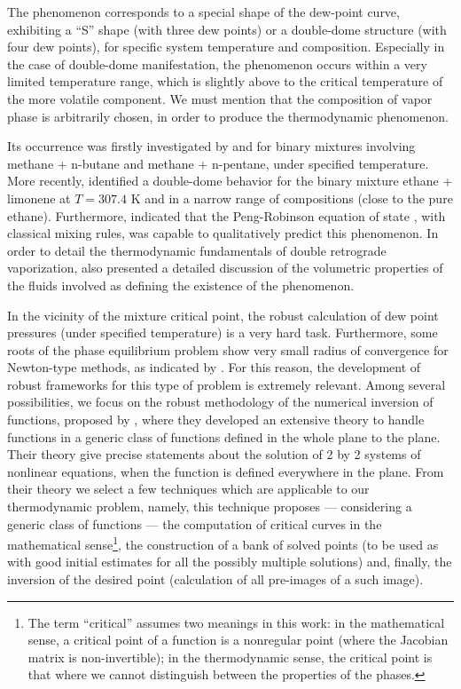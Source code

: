 \documentclass[journal=iecred,manuscript=article]{achemso}
\theoremstyle{definition}
\theoremstyle{remark}
\begin{document}
The phenomenon corresponds to a special shape of the dew-point curve, exhibiting a \enquote{S} shape (with three dew points) or a double-dome structure (with four dew points), for specific system temperature and composition. Especially in the case of double-dome manifestation, the phenomenon occurs within a very limited temperature range, which is slightly above to the critical temperature of the more volatile component. We must mention that the composition of vapor phase is arbitrarily chosen, in order to produce the thermodynamic phenomenon.

Its occurrence was firstly investigated by \citet{chen_1} and \citet{chen_2} for binary mixtures involving methane + n-butane and methane + n-pentane, under specified temperature. More recently, \citet{raeissi_1} identified a double-dome behavior for the binary mixture ethane + limonene at $T = 307.4$ K and in a narrow range of compositions (close to the pure ethane). Furthermore, \citet{raeissi_2} indicated that the Peng-Robinson equation of state \citep{peng_robinson}, with classical mixing rules, was capable to qualitatively predict this phenomenon. In order to detail the thermodynamic fundamentals of double retrograde vaporization, \citet{raeissi2004thermodynamic} also presented a detailed discussion of the volumetric properties of the fluids involved as defining the existence of the phenomenon.

In the vicinity of the mixture critical point, the robust calculation of dew point pressures (under specified temperature) is a very hard task. Furthermore, some roots of the phase equilibrium problem show very small radius of convergence for Newton-type methods, as indicated by \citet{jnsa}. For this reason, the development of robust frameworks for this type of problem is extremely relevant. Among several possibilities, we focus on the robust methodology of the numerical inversion of functions, proposed by \citet{malta}, 
where they developed an extensive theory to handle functions
in a generic class of functions
defined in the whole plane to the plane. 
Their theory give precise statements about the 
solution of 2 by 2 systems of nonlinear equations, when 
the function is defined everywhere in the plane. 
From their theory we select a few techniques which
are applicable to our thermodynamic problem, namely, this technique \citep{malta} proposes --- considering a 
generic class of functions --- the computation of
 critical curves in the mathematical 
sense\footnote{The term \enquote{critical} assumes two meanings in this work: in the mathematical sense, a critical point of a function
 is a nonregular point (where the Jacobian matrix is 
 non-invertible); in the thermodynamic sense, the 
 critical point is that where we cannot distinguish 
 between the properties of the phases.}, the construction 
 of a bank of solved points
  (to be used  as 
 with good initial estimates for all 
 the possibly multiple solutions) and, finally, the inversion 
 of the desired point (calculation of all pre-images of a such 
 image).
 
\end{document}
